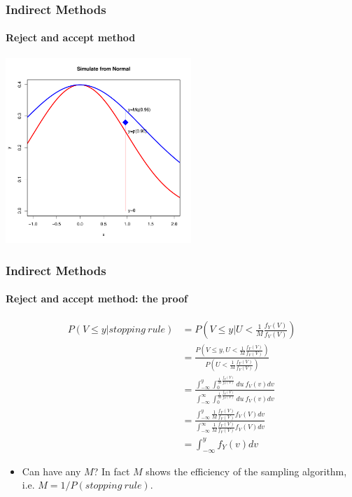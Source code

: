 \documentclass[10pt]{beamer}
\begin{document}
              \begin{frame}
                \frametitle{Indirect Methods}
                \framesubtitle{Reject and accept method}
                \begin{center}
                  \includegraphics[height=7cm]{./Pics/nmlg7.pdf}
                \end{center}
              \end{frame}


              \begin{frame}
                \frametitle{Indirect Methods}
                \framesubtitle{Reject and accept method: the proof}
                \vspace{-0.6cm}
                \begin{align*}
                  P(V\leq y |stopping~rule)&= P(V\leq y | U < \frac{1}{M} \frac{f_Y(V)}{f_V(V)})\\
                                           &= \frac{P(V\leq y , U < \frac{1}{M} \frac{f_Y(V)}{f_V(V)})}{P(U <
                                             \frac{1}{M} \frac{f_Y(V)}{f_V(V)})}\\
                                           &= \frac{\int_{-\infty}^y\int_0^{\frac{1}{M}
                                             \frac{f_Y(V)}{f_V(V)}}du~f_V(v)dv}{\int_{-\infty}^{\infty}\int_0^{\frac{1}{M}
                                             \frac{f_Y(V)}{f_V(V)}}du~f_V(v)dv}\\
                                           &= \frac{\int_{-\infty}^y\frac{1}{M}
                                             \frac{f_Y(V)}{f_V(V)}f_V(V)dv}{\int_{-\infty}^{\infty}\frac{1}{M}
                                             \frac{f_Y(V)}{f_V(V)}f_V(V)dv}\\
                                           &=\int_{-\infty}^y f_Y(v)dv
                \end{align*}

                \begin{itemize}
                \item Can have any $M$? In fact $M$ shows the efficiency of the sampling
                  algorithm, i.e.  $M= 1/P(stopping~rule)$.
                \end{itemize}
              \end{frame}
\end{document}
